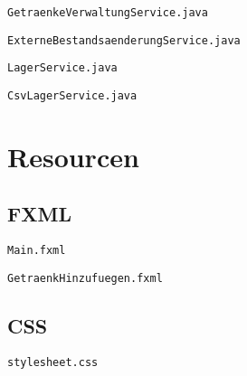 \verb|GetraenkeVerwaltungService.java|



\verb|ExterneBestandsaenderungService.java|



\verb|LagerService.java|



\verb|CsvLagerService.java|



\clearpage

\section{Resourcen}

\subsection{FXML}

\verb|Main.fxml|



\verb|GetraenkHinzufuegen.fxml|



\clearpage

\subsection{CSS}

\verb|stylesheet.css|

